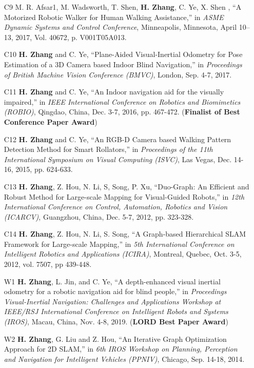\begin{justify}
\begin{itemize}[before=\fontsize{9pt}{1em}\bodyfontlight\upshape\color{text},leftmargin=3ex, nosep, noitemsep]
		\item[C9]{M. R. Afsar1, M. Wadsworth, T. Shen, \textbf{H. Zhang}, C. Ye, X. Shen , “A Motorized Robotic Walker for Human Walking Assistance,” in \emph{ASME Dynamic Systems and Control Conference}, Minneapolis, Minnesota, April 10–13, 2017, Vol. 40672, p. V001T05A013.}
		\item[C10]{\textbf{H. Zhang} and C. Ye, “Plane-Aided Visual-Inertial Odometry for Pose Estimation of a 3D Camera based Indoor Blind Navigation,” in \emph{Proceedings of British Machine Vision Conference (BMVC)}, London, Sep. 4-7, 2017.}
		\item[C11]{\textbf{H. Zhang} and C. Ye, “An Indoor navigation aid for the visually impaired,” in \emph{IEEE International Conference on Robotics and Biomimetics (ROBIO)}, Qingdao, China, Dec. 3-7, 2016, pp. 467-472. (\textbf{Finalist of Best Conference Paper Award})}
		\item[C12]{\textbf{H. Zhang} and C. Ye, “An RGB-D Camera based Walking Pattern Detection Method for Smart Rollators,” in \emph{Proceedings of the 11th International Symposium on Visual Computing (ISVC)}, Las Vegas, Dec. 14-16, 2015, pp. 624-633.}
		\item[C13]{\textbf{H. Zhang}, Z. Hou, N. Li, S, Song, P. Xu, “Duo-Graph: An Efficient and Robust Method for Large-scale Mapping for Visual-Guided Robots,” in \emph{12th International Conference on Control, Automation, Robotics and Vision (ICARCV)}, Guangzhou, China, Dec. 5-7, 2012, pp. 323-328.}
		\item[C14]{\textbf{H. Zhang}, Z. Hou, N. Li, S. Song, “A Graph-based Hierarchical SLAM Framework for Large-scale Mapping,” in \emph{5th International Conference on Intelligent Robotics and Applications (ICIRA)}, Montreal, Quebec, Oct. 3-5, 2012, vol. 7507, pp 439-448.}
	\end{itemize}
\end{justify}


\begin{justify}
	\begin{itemize}[before=\fontsize{9pt}{1em}\bodyfontlight\upshape\color{text},leftmargin=3ex, nosep, noitemsep]
		\setlength{\parskip}{0pt}
		\renewcommand{\labelitemi}{\bullet}
		\item[W1]{\textbf{H. Zhang}, L. Jin, and C. Ye, “A depth-enhanced visual inertial odometry for a robotic navigation aid for blind people,” in \emph{Proceedings Visual-Inertial Navigation: Challenges and Applications Workshop at IEEE/RSJ International Conference on Intelligent Robots and Systems (IROS)}, Macau, China, Nov. 4-8, 2019. (\textbf{LORD Best Paper Award})}
		\item[W2]{\textbf{H. Zhang}, G. Liu and Z. Hou, “An Iterative Graph Optimization Approach for 2D SLAM,” in \emph{ 6th IROS Workshop on Planning, Perception and Navigation for Intelligent Vehicles (PPNIV)}, Chicago, Sep. 14-18, 2014.}
	\end{itemize}
\end{justify}


